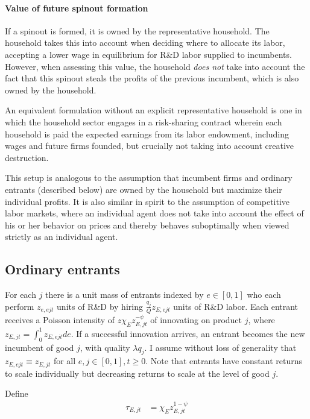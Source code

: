 \documentclass[12pt,english]{article}
\theoremstyle{remark}
\begin{document}
\paragraph{Value of future spinout formation}

If a spinout is formed, it is owned by the representative household. The household takes this into account when deciding where to allocate its labor, accepting a lower wage in equilibrium for R\&D labor supplied to incumbents. However, when assessing this value, the household \textit{does not} take into account the fact that this spinout steals the profits of the previous incumbent, which is also owned by the household. 

An equivalent formulation without an explicit representative household is one in which the household sector engages in a risk-sharing contract wherein each household is paid the expected earnings from its labor endowment, including wages and future firms founded, but crucially not taking into account creative destruction.  

This setup is analogous to the assumption that incumbent firms and ordinary entrants (described below) are owned by the household but maximize their individual profits. It is also similar in spirit to the assumption of competitive labor markets, where an individual agent does not take into account the effect of his or her behavior on prices and thereby behaves suboptimally when viewed strictly as an individual agent. 


\subsection{Ordinary entrants}

For each $j$ there is a unit mass of entrants indexed by $e \in [0,1]$ who each perform $z_{e,ejt}$ units of R\&D by hiring $\frac{q_j}{Q} z_{E,ejt}$ units of R\&D labor. Each entrant receives a Poisson intensity of $z \chi_E z_{E,jt}^{-\psi}$ of innovating on product $j$, where $z_{E,jt} = \int_0^1 z_{E,ejt} de$. If a successful innovation arrives, an entrant becomes the new incumbent of good $j$, with quality $\lambda q_j$. I assume without loss of generality that $z_{E,ejt} \equiv z_{E,jt}$ for all $e,j \in [0,1], t \ge 0$. Note that entrants have constant returns to scale individually but decreasing returns to scale at the level of good $j$.

Define
\begin{align*}
	\tau_{E,jt} &= \chi_E z_{E,jt}^{1-\psi}
\end{align*}
\end{document}
